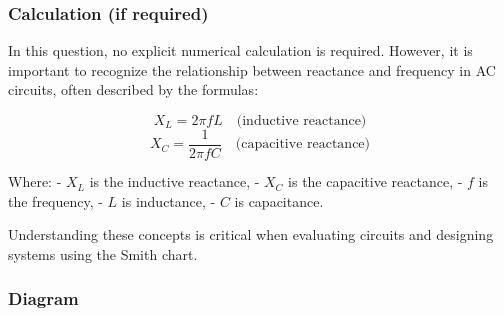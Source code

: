 \subsubsection{Calculation (if required)}

In this question, no explicit numerical calculation is required. However, it is important to recognize the relationship between reactance and frequency in AC circuits, often described by the formulas:

\[
X_L = 2 \pi f L \quad \text{(inductive reactance)}
\]
\[
X_C = \frac{1}{2 \pi f C} \quad \text{(capacitive reactance)}
\]

Where:
- \(X_L\) is the inductive reactance,
- \(X_C\) is the capacitive reactance,
- \(f\) is the frequency, 
- \(L\) is inductance,
- \(C\) is capacitance.

Understanding these concepts is critical when evaluating circuits and designing systems using the Smith chart.

\subsubsection{Diagram}

